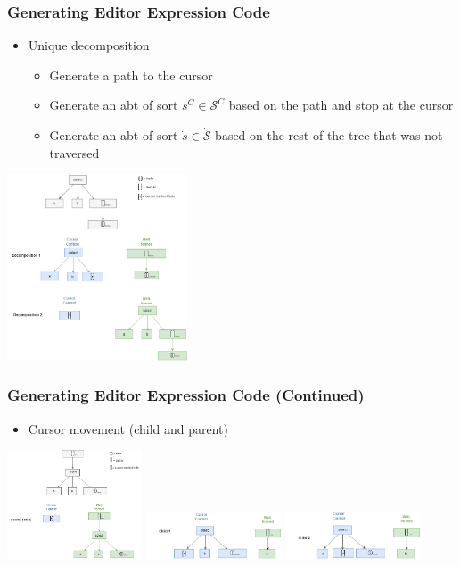 \documentclass[t,24pt,aspectratio=169]{beamer}
\begin{document}
\begin{frame}[hvid]
    \frametitle{Generating Editor Expression Code}
    \begin{multicols}{2}
        \begin{itemize}
            \item Unique decomposition
                  \begin{itemize}
                      \item Generate a path to the cursor
                      \item Generate an abt of sort $s^C \in \mathcal{S}^C$ based on the path and stop at the cursor
                      \item Generate an abt of sort $\dot{s} \in \dot{\mathcal{S}}$
                            based on the rest of the tree that was not traversed
                  \end{itemize}
        \end{itemize}
        \columnbreak
        \includegraphics[width=0.4\textwidth]{img/slq-decompose-ex.drawio.png}
    \end{multicols}
\end{frame}

\begin{frame}[hvid]
    \frametitle{Generating Editor Expression Code (Continued)}
    \begin{itemize}
        \item Cursor movement (child and parent)
    \end{itemize}
    \includegraphics[width=0.3\textwidth]{img/slq-decomp-only.drawio.png}
    \includegraphics[width=0.3\textwidth]{img/sql-child1.drawio.png}
    \includegraphics[width=0.3\textwidth]{img/sql-child2.drawio.png}
\end{frame}
\end{document}
